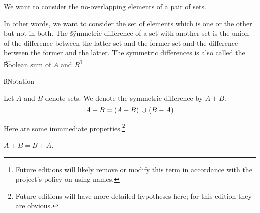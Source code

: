 

We want to consider the no-overlapping elements of a pair of sets.


In other words, we want to consider the set of elements which is one or the other but not in both.
The \t{symmetric difference} of a set with another set is the union of the difference between the latter set and the former set and the difference between the former and the latter.
The symmetric differences is also called the \t{Boolean sum} of $A$ and $B$\footnote{Future editions will likely remove or modify this term in accordance with the project's policy on using names.}

\ss{Notation}

Let $A$ and $B$ denote sets.
We denote the symmetric difference by $A + B$.
\[
  A + B = (A - B) \,\cup\, (B - A)
\]


Here are some immmediate properties.\footnote{Future editions will have more detailed hypotheses here; for this edition they are obvious.}

\begin{proposition}[Commutative]
  $A + B = B + A$.
\end{proposition}


\blankpage
